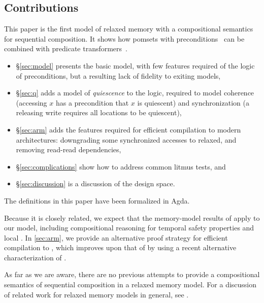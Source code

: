 \subsection{Contributions}

This paper is the first model of relaxed memory with a compositional
semantics for sequential composition.  It shows how pomsets with
preconditions~\cite{DBLP:journals/pacmpl/JagadeesanJR20} can be combined
with predicate transformers~\cite{DBLP:journals/cacm/Dijkstra75}.
\begin{itemize}
\item \S\ref{sec:model} presents the basic model, with few features
  required of the logic of preconditions, but a resulting lack of fidelity
  to exiting models,
\item \S\ref{sec:q} adds a model of \emph{quiescence} to the logic,
  required to model coherence (accessing $x$ has a precondition that $x$ is quiescent)
  and synchronization (a releasing write requires all locations to be quiescent),
\item \S\ref{sec:arm} adds the features required for efficient compilation
  to modern architectures: downgrading some synchronized accesses to relaxed,
  and removing read-read dependencies,
\item \S\ref{sec:complications} show how to address common litmus tests, and
\item \S\ref{sec:discussion} is a discussion of the design space.
\end{itemize}
The definitions in this paper have been formalized in Agda.

Because it is closely related, we expect that the memory-model results of
\cite{DBLP:journals/pacmpl/JagadeesanJR20} apply to our model, including
compositional reasoning for temporal safety properties and {local} \drfsc.
In \textsection\ref{sec:arm}, we provide an alternative proof strategy for
efficient compilation to \armeight{}, which improves upon that of
\cite{DBLP:journals/pacmpl/JagadeesanJR20} by using a recent alternative
characterization of \armeight{}.

As far as we are aware, there are no previous attempts to provide a
compositional semantics of sequential composition in a relaxed memory model.
For a discussion of related work for relaxed memory models in general, see
\cite{DBLP:journals/pacmpl/JagadeesanJR20}.
